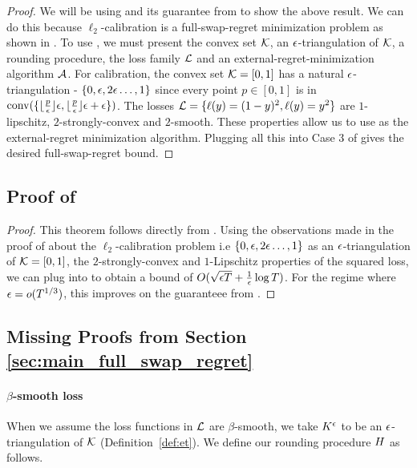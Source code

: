 \begin{proof}
We will be using  and its guarantee from  to show the above result. We can do this because $\ell_2$-calibration is a full-swap-regret minimization problem as shown in .
To use , we must present the convex set $\mathcal{K}$, an $\epsilon$-triangulation of $\mathcal{K}$, a rounding procedure, the loss family $\mathcal{L}$ and an external-regret-minimization algorithm $\mathcal{A}$. For calibration, the convex set $\mathcal{K} = [0,1]$ has a natural $\epsilon$-triangulation - $\{0, \epsilon, 2\epsilon \ldots, 1 \}$ since every point $p \in [0,1]$ is in $\mathrm{conv}(\{ \lfloor \frac{p}{\epsilon} \rfloor \epsilon, \lfloor \frac{p}{\epsilon} \rfloor \epsilon + \epsilon \})$. The losses $\mathcal{L} = \{ \ell (y) = (1 - y)^2, \ell (y) = y^2\} $ are $1$-lipschitz, $2$-strongly-convex and $2$-smooth. These properties allow us to use  as the external-regret minimization algorithm. Plugging all this into Case 3 of  gives the desired full-swap-regret bound. 
\end{proof}

\subsection{Proof of }\label{app:discrete_calib_bound}
\begin{proof}
This theorem follows directly from .
Using the observations made in the proof of  about the $\ell_2$-calibration problem i.e $\{0, \epsilon, 2\epsilon \ldots, 1 \}$ as an $\epsilon$-triangulation of $\mathcal{K} = [0,1]$, the $2$-strongly-convex and $1$-Lipschitz properties of the squared loss, we can plug into  to obtain a bound of $O(\sqrt{\epsilon T} + \frac{1}{\epsilon} \log T)$. For the regime where $\epsilon = o(T^{1/3})$, this improves on the guaranteee from .
\end{proof}

\subsection{Missing Proofs from Section \ref{sec:main_full_swap_regret}}\label{app:full_swap_regret}

\paragraph{$\beta$-smooth loss} When we assume the loss functions in $\mathcal{L}$ are $\beta$-smooth, we take $K^{\epsilon}$ to be an $\epsilon$-triangulation of $\mathcal{K}$ (Definition~\ref{def:et}).  We define our rounding procedure $H$ as follows.

